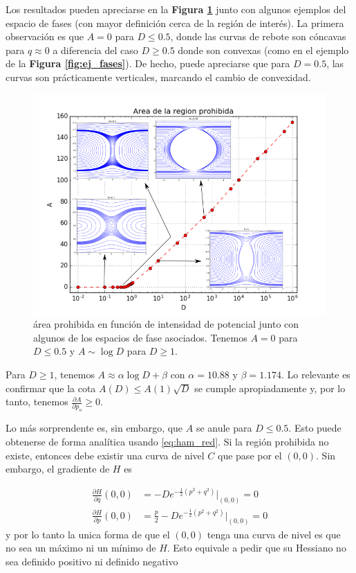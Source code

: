 \documentclass[twoside, 12pt]{article}
\providecommand{\dpart}[2]{\frac{\partial#1}{\partial#2}}
\begin{document}
Los resultados pueden apreciarse en la \textbf{Figura \ref{fig:AvsD}} junto con algunos ejemplos del espacio de fases (con mayor definición cerca de la región de interés).
La primera observación es que $A=0$ para $D\leq 0.5$, donde las curvas de rebote son cóncavas para $q\approx 0$ a diferencia del caso $D\geq 0.5$ donde son convexas (como en el ejemplo
de la \textbf{Figura \ref{fig:ej_fases}}). De hecho, puede apreciarse que para $D=0.5$, las curvas son prácticamente verticales, marcando el cambio de convexidad.

\begin{figure}[H]
	\centering
	\includegraphics[trim = 0mm 0mm 15mm 10mm, clip, width=\columnwidth]{AvsD_full.png}
	\caption{área prohibida en función de intensidad de potencial junto con algunos de los espacios de fase asociados. Tenemos $A=0$ para $D\leq 0.5$ y $A\sim \log{D}$ para $D\geq 1$.}
	\label{fig:AvsD}
\end{figure}

Para $D\geq 1$, tenemos $A \approx \alpha \log{D} + \beta$ con $\alpha = 10.88$ y $\beta = 1.174$.
Lo relevante es confirmar que la cota $A(D) \leq A(1)\sqrt{D}$ se cumple apropiadamente y, por lo tanto, tenemos $\dpart{A}{p_o} \geq 0$.

Lo más sorprendente es, sin embargo, que $A$ se anule para $D\leq 0.5$. Esto puede obtenerse de forma analítica usando \eqref{eq:ham_red}.
Si la región prohibida no existe, entonces debe existir una curva de nivel $C$ que pase por el $(0,0)$.
Sin embargo, el gradiente de $H$ es

\begin{align*}
\dpart{H}{q}(0,0) &= -De^{-\frac{1}{2} (p^2+q^2)}\Big|_{(0,0)} = 0 \\
\dpart{H}{p}(0,0) &= \frac{p}{2} - De^{-\frac{1}{2} (p^2+q^2)}\Big|_{(0,0)} = 0
\end{align*}
y por lo tanto la unica forma de que el $(0,0)$ tenga una curva de nivel es que no sea un máximo ni un mínimo de $H$.
Esto equivale a pedir que su Hessiano no sea definido positivo ni definido negativo
\end{document}
